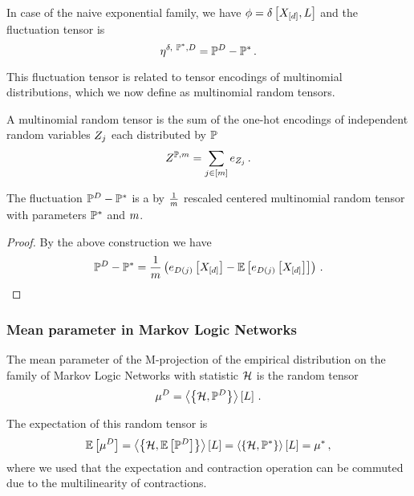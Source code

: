 
In case of the naive exponential family, we have $\phi=\delta\left[X_{[d]},L\right]$ and the fluctuation tensor is
	\[ \naivefluctuation = \empdistribution - \gendistribution \, .  \]

This fluctuation tensor is related to tensor encodings of multinomial distributions, which we now define as multinomial random tensors.

\begin{definition}
	A multinomial random tensor is the sum of the one-hot encodings of independent random variables $Z_j$ each distributed by $\mathbb{P}$
		\[ Z^{\mathbb{P}, m} = \sum_{j\in[m]} e_{Z_j} \, . \] 
\end{definition}

\begin{lemma}\label{lem:multinomialEmpdistFluctuation}
	The fluctuation $\mathbb{P}^{D} - \mathbb{P}^*$ is a by $\frac{1}{m}$ rescaled centered multinomial random tensor with parameters $\mathbb{P}^*$ and $m$. %
\end{lemma}
\begin{proof}
	By the above construction we have
		\[  \mathbb{P}^{D} - \mathbb{P}^* = \frac{1}{m} \left( e_{D(j)}\left[X_{[d]}\right] - \mathbb{E}\left[e_{D(j)}\left[X_{[d]}\right]\right] \right) \, .  \]
\end{proof}


\subsubsection{Mean parameter in Markov Logic Networks}

The mean parameter of the M-projection of the empirical distribution on the family of Markov Logic Networks with statistic $\mathcal{H}$ is the random tensor
\begin{align*}
	\mu^D =  \left\langle \left\{\mathcal{H},\mathbb{P}^{D}\right\}\right\rangle \left[ L \right] \, . 
\end{align*}

The expectation of this random tensor is
\begin{align*}
	\mathbb{E}\left[\mu^D\right] 
	=  \left\langle \left\{\mathcal{H},\mathbb{E}\left[\mathbb{P}^{D}\right]\right\}\right\rangle \left[ L \right] 
	=  \left\langle \left\{\mathcal{H},\mathbb{P}^*\right\}\right\rangle \left[ L \right] 
	=  \mu^* \, ,  
\end{align*}
where we used that the expectation and contraction operation can be commuted due to the multilinearity of contractions.

